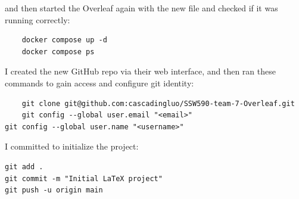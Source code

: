 and then started the Overleaf again with the new file and checked if it was running correctly:
\begin{verbatim}
    docker compose up -d
    docker compose ps
\end{verbatim}

I created the new GitHub repo via their web interface, and then ran these commands to gain access and configure git identity:
\begin{verbatim}
    git clone git@github.com:cascadingluo/SSW590-team-7-Overleaf.git
    git config --global user.email "<email>"
git config --global user.name "<username>"
\end{verbatim}

I committed to initialize the project:
\begin{verbatim}
git add .
git commit -m "Initial LaTeX project"
git push -u origin main
\end{verbatim}

